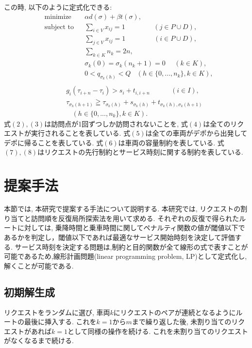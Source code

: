\documentclass[a4j,11pt,twocolumn]{jsarticle}
\begin{document}
この時, 以下のように定式化できる:
\begin{align*}
  &\textrm{minimize}   &&
  \alpha d(\sigma)+ \beta t(\sigma),\tag{1}\\
  &\textrm{subject to} && \sum_{i \in V} x_{ij} = 1 \ \ \ \ \ \ \ \ \ \ \ \ \ \ \ \ \ \ \ (j \in  P \cup D), \tag{2}\\
  &                    && \sum_{j \in V} x_{ij} = 1 \ \ \ \ \ \ \ \ \ \ \ \ \ \ \ \ \ \ \ (i \in  P \cup D), \tag{3}\\
  &                    && \sum_{k \in K} n_k = 2n,\tag{4}\\
  &                    && \sigma_k(0) = \sigma_k(n_k+1) = 0 \ \ \ \ \ \ (k \in K),\tag{5}\\
  &                    && 0 < q_{\sigma_k(h)} < Q\ \ \ \
  (h \in \{0,...,n_k\},k \in K),\tag{6}\\
\end{align*}
\begin{align*}
  &                    && g_i(\tau_{i+n}-\tau_i) > s_i + t_{i,i+n}\ \ \ \ \ \ \ \ \ \ \ \ \ \  (i \in I),\tag{7}\\
  &                    && \tau_ {\sigma_k (h+1)} \geqq \tau_ {\sigma_k (h)} + s_{\sigma_k (h)} + t_ {\sigma_k (h),\sigma_k (h+1)}\\
  &                    &&  \ \ \ \ (h \in \{0,...,n_k\},k \in K).\tag{8}
\end{align*}
式$(2),(3)$は訪問点が1回ずつしか訪問されないことを, 式$(4)$は全てのリクエストが実行されることを表している. 式$(5)$は全ての車両がデポから出発してデポに帰ることを表している. 式$(6)$は車両の容量制約を表している. 式$(7),(8)$はリクエストの先行制約とサービス時刻に関する制約を表している.

\section{提案手法}
本節では, 本研究で提案する手法について説明する. 本研究では, リクエストの割り当てと訪問順を反復局所探索法を用いて求める. それぞれの反復で得られたルートに対しては, 乗降時間と乗車時間に関してペナルティ関数の値が閾値以下であるかを判定し，閾値以下であれば最適なサービス開始時刻を決定して評価する.
サービス時刻を決定する問題は,制約と目的関数が全て線形の式で表すことが可能であるため,線形計画問題(linear programming problem, LP)として定式化し,解くことが可能である.

\subsection{{\large 初期解生成}}
リクエストをランダムに選び, 車両$k$にリクエストのペアが連続となるようにルートの最後に挿入する. これを$k = 1 から m$まで繰り返した後, 未割り当てのリクエストがあれば$k = 1 $として同様の操作を続ける. これを未割り当てのリクエストがなくなるまで続ける.
\end{document}
